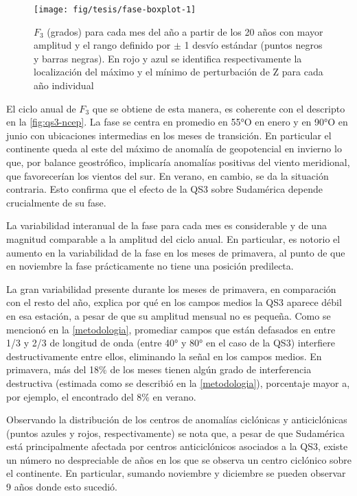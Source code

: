 \documentclass[spanish,a4paper,12pt,oneside]{book}
\begin{document}
\begin{landscape}\begin{figure}

{\centering \texttt{[image: fig/tesis/fase-boxplot-1]} 

}

\caption{$F_3$ (grados) para cada mes del año a partir de los 20 años con mayor amplitud y el rango definido por $\pm$ 1 desvío estándar  (puntos negros y barras negras). En rojo y azul se identifica respectivamente la localización del máximo y el mínimo de perturbación de Z para cada año individual}\label{fig:fase-boxplot}
\end{figure}
\end{landscape}

El ciclo anual de \(F_3\) que se obtiene de esta manera, es coherente
con el descripto en la \autoref{fig:qs3-ncep}. La fase se centra en
promedio en 55°O en enero y en 90°O en junio con ubicaciones intermedias
en los meses de transición. En particular el continente queda al este
del máximo de anomalía de geopotencial en invierno lo que, por balance
geostrófico, implicaría anomalías positivas del viento meridional, que
favorecerían los vientos del sur. En verano, en cambio, se da la
situación contraria. Esto confirma que el efecto de la QS3 sobre
Sudamérica depende crucialmente de su fase.

La variabilidad interanual de la fase para cada mes es considerable y de
una magnitud comparable a la amplitud del ciclo anual. En particular, es
notorio el aumento en la variabilidad de la fase en los meses de
primavera, al punto de que en noviembre la fase prácticamente no tiene
una posición predilecta.

La gran variabilidad presente durante los meses de primavera, en
comparación con el resto del año, explica por qué en los campos medios
la QS3 aparece débil en esa estación, a pesar de que su amplitud mensual
no es pequeña. Como se mencionó en la \autoref{metodologia}, promediar
campos que están defasados en entre 1/3 y 2/3 de longitud de onda (entre
40° y 80° en el caso de la QS3) interfiere destructivamente entre ellos,
eliminando la señal en los campos medios. En primavera, más del 18\% de
los meses tienen algún grado de interferencia destructiva (estimada como
se describió en la \autoref{metodologia}), porcentaje mayor a, por
ejemplo, el encontrado del 8\% en verano.

Observando la distribución de los centros de anomalías ciclónicas y
anticiclónicas (puntos azules y rojos, respectivamente) se nota que, a
pesar de que Sudamérica está principalmente afectada por centros
anticiclónicos asociados a la QS3, existe un número no despreciable de
años en los que se observa un centro ciclónico sobre el continente. En
particular, sumando noviembre y diciembre se pueden observar 9 años
donde esto sucedió.
\end{document}
